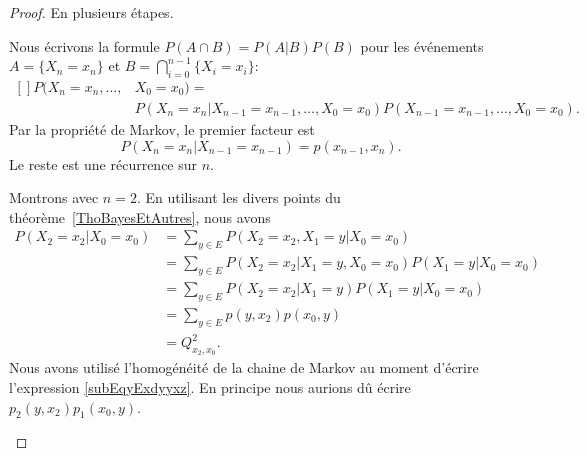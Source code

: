 \begin{proof}
	En plusieurs étapes.
	\begin{subproof}
		Nous écrivons la formule \( P(A\cap B)=P(A|B)P(B)\) pour les événements \( A=\{ X_n=x_n \}\) et \( B=\bigcap_{i=0}^{n-1}\{ X_i=x_i \}\):
		\begin{equation}
			\begin{aligned}[]
				P(X_n=x_n,\ldots, & X_0=x_0)=                                                                   \\
				\qquad            & P(X_n=x_n|X_{n-1}=x_{n-1},\ldots,X_0=x_0)P(X_{n-1}=x_{n-1},\ldots,X_0=x_0).
			\end{aligned}
		\end{equation}
		Par la propriété de Markov, le premier facteur est
		\begin{equation}
			P(X_n=x_n|X_{n-1}=x_{n-1})=p(x_{n-1},x_n).
		\end{equation}
		Le reste est une récurrence sur \( n\).

		Montrons avec \( n=2\). En utilisant les divers points du théorème~\ref{ThoBayesEtAutres}, nous avons
		\begin{subequations}
			\begin{align}
				P(X_2=x_2|X_0=x_0) & =\sum_{y\in E}P(X_2=x_2,X_1=y|X_0=x_0)                 \\
				                   & =\sum_{y\in E}P(X_2=x_2|X_1=y,X_0=x_0)P(X_1=y|X_0=x_0) \\
				                   & =\sum_{y\in E}P(X_2=x_2|X_1=y)P(X_1=y|X_0=x_0)         \\
				                   & =\sum_{y\in E}p(y,x_2)p(x_0,y) \label{subEqyExdyyxz}   \\
				                   & =Q^2_{x_2,x_0}.
			\end{align}
		\end{subequations}
		Nous avons utilisé l'homogénéité de la chaine de Markov au moment d'écrire l'expression \eqref{subEqyExdyyxz}. En principe nous aurions dû écrire \( p_2(y,x_2)p_1(x_0,y)\).


\end{subproof}
\end{proof}
